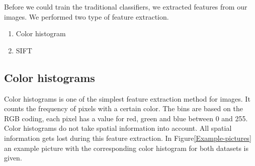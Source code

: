 \documentclass[11pt]{article}
\begin{document}
Before we could train the traditional classifiers, we extracted features from our images. We performed two type of feature extraction. 

\begin{enumerate}
\item{Color histogram}
\item{SIFT}
\end{enumerate}

\subsection{Color histograms}
Color histograms is one of the simplest feature extraction method for images. It counts the frequency of pixels with a certain color. The bins are based on the RGB coding, each pixel has a value for red, green and blue between 0 and 255. Color histograms do not take spatial information into account. All spatial information gets lost during this feature extraction. In Figure\ref{Example-pictures} an example picture with the corresponding color histogram for both datasets is given.\\
%
\end{document}
